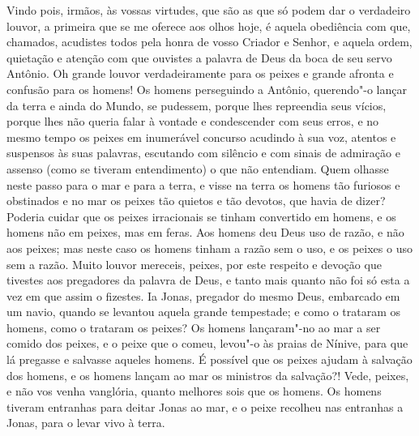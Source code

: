 Vindo pois, irmãos, às vossas virtudes, que são as que só podem dar o
verdadeiro louvor, a primeira que se me oferece aos olhos hoje, é aquela
obediência com que, chamados, acudistes todos pela honra de vosso
Criador e Senhor, e aquela ordem, quietação e atenção com que ouvistes a
palavra de Deus da boca de seu servo Antônio. Oh grande louvor
verdadeiramente para os peixes e grande afronta e confusão para os
homens! Os homens perseguindo a Antônio, querendo"-o lançar da terra e
ainda do Mundo, se pudessem, porque lhes repreendia seus vícios, porque
lhes não queria falar à vontade e condescender com seus erros, e no
mesmo tempo os peixes em inumerável concurso acudindo à sua voz, atentos
e suspensos às suas palavras, escutando com silêncio e com sinais de
admiração e assenso (como se tiveram entendimento) o que não entendiam.
Quem olhasse neste passo para o mar e para a terra, e visse na terra os
homens tão furiosos e obstinados e no mar os peixes tão quietos e tão
devotos, que havia de dizer? Poderia cuidar que os peixes irracionais se
tinham convertido em homens, e os homens não em peixes, mas em feras.
Aos homens deu Deus uso de razão, e não aos peixes; mas neste caso os
homens tinham a razão sem o uso, e os peixes o uso sem a razão.
Muito louvor mereceis, peixes, por este respeito e devoção que tivestes
aos pregadores da palavra de Deus, e tanto mais quanto não foi só esta a
vez em que assim o fizestes. Ia Jonas, pregador do mesmo Deus, embarcado
em um navio, quando se levantou aquela grande tempestade; e como o
trataram os homens, como o trataram os peixes? Os homens lançaram"-no ao
mar a ser comido dos peixes, e o peixe que o comeu, levou"-o às praias de
Nínive, para que lá pregasse e salvasse aqueles homens. É possível que
os peixes ajudam à salvação dos homens, e os homens lançam ao mar os
ministros da salvação?! Vede, peixes, e não vos venha vanglória, quanto
melhores sois que os homens. Os homens tiveram entranhas para deitar
Jonas ao mar, e o peixe recolheu nas entranhas a Jonas, para o levar
vivo à terra.

